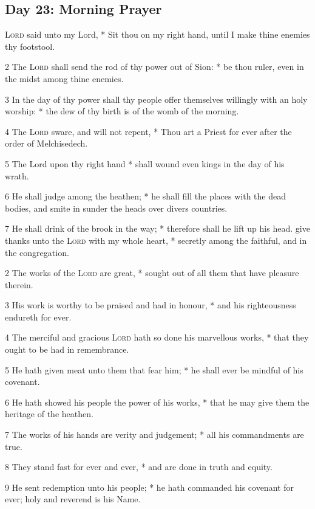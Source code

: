 \subsection{Day 23: Morning Prayer}
 {\textsc{Lord}} said unto my Lord, * Sit thou on my right hand, until I make thine enemies thy footstool.\par
2 The {\textsc{Lord}} shall send the rod of thy power out of Sion: * be thou ruler, even in the midst among thine enemies.\par
3 In the day of thy power shall thy people offer themselves willingly with an holy worship: * the dew of thy birth is of the womb of the morning.\par
4 The {\textsc{Lord}} sware, and will not repent, * Thou art a Priest for ever after the order of Melchisedech.\par
5 The Lord upon thy right hand * shall wound even kings in the day of his wrath.\par
6 He shall judge among the heathen; * he shall fill the places with the dead bodies, and smite in sunder the heads over divers countries.\par
7 He shall drink of the brook in the way; * therefore shall he lift up his head.
 give thanks unto the {\textsc{Lord}} with my whole heart, * secretly among the faithful, and in the congregation.\par
2 The works of the {\textsc{Lord}} are great, * sought out of all them that have pleasure therein.\par
3 His work is worthy to be praised and had in honour, * and his righteousness endureth for ever.\par
4 The merciful and gracious {\textsc{Lord}} hath so done his marvellous works, * that they ought to be had in remembrance.\par
5 He hath given meat unto them that fear him; * he shall ever be mindful of his covenant.\par
6 He hath showed his people the power of his works, * that he may give them the heritage of the heathen.\par
7 The works of his hands are verity and judgement; * all his commandments are true.\par
8 They stand fast for ever and ever, * and are done in truth and equity.\par
9 He sent redemption unto his people; * he hath commanded his covenant for ever; holy and reverend is his Name.\par
